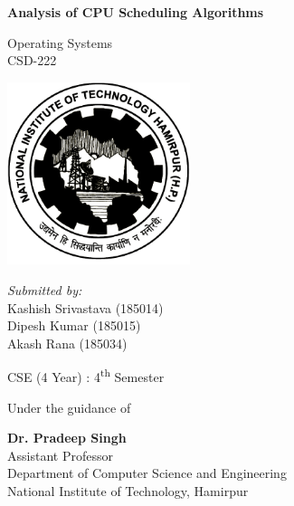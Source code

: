 \documentclass[11pt,a4paper]{report}
\begin{document}
\begin{titlepage}
    \begin{center}

        \Huge{\textbf{Analysis of CPU Scheduling Algorithms}}
 
        \vspace{5pt}
        
        \normalsize
       
        \vspace{5pt}
        
        Operating Systems\\
        CSD-222

    
        \vspace{10pt}
        \includegraphics[width=0.4\textwidth]{./img/logo.png}
        
        \vspace{15pt}
        \textit{Submitted by:}\\
            Kashish Srivastava (185014)\\
            Dipesh Kumar (185015)\\
            Akash Rana (185034)
        \vspace{5pt}
 
        CSE (4 Year) : 
        4\textsuperscript{th} Semester
 
        \vspace{1cm}
 
        Under the guidance of
        
        \vspace{5pt}
        
        \textbf{Dr. Pradeep Singh }\\
		\large
		Assistant Professor\\ Department of Computer Science and Engineering\\
		National Institute of Technology, Hamirpur\\
		
      
    \end{center}
\end{titlepage}
\end{document}
